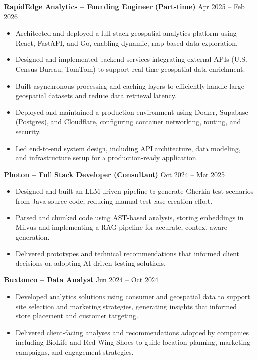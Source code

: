 \documentclass[11pt]{article}
\begin{document}
\textbf{RapidEdge Analytics – Founding Engineer (Part-time)} \hfill Apr 2025 -- Feb 2026
\begin{itemize}
    \item Architected and deployed a full-stack geospatial analytics platform using React, FastAPI, and Go, enabling dynamic, map-based data exploration.
    \item Designed and implemented backend services integrating external APIs (U.S. Census Bureau, TomTom) to support real-time geospatial data enrichment.
    \item Built asynchronous processing and caching layers to efficiently handle large geospatial datasets and reduce data retrieval latency.
    \item Deployed and maintained a production environment using Docker, Supabase (Postgres), and Cloudflare, configuring container networking, routing, and security.
    \item Led end-to-end system design, including API architecture, data modeling, and infrastructure setup for a production-ready application.
\end{itemize}

\textbf{Photon – Full Stack Developer (Consultant)} \hfill Oct 2024 -- Mar 2025
\begin{itemize}
    \item Designed and built an LLM-driven pipeline to generate Gherkin test scenarios from Java source code, reducing manual test case creation effort.
    \item Parsed and chunked code using AST-based analysis, storing embeddings in Milvus and implementing a RAG pipeline for accurate, context-aware generation.
    \item Delivered prototypes and technical recommendations that informed client decisions on adopting AI-driven testing solutions.
\end{itemize}

\textbf{Buxtonco – Data Analyst} \hfill Jun 2024 -- Oct 2024
\begin{itemize}
    \item Developed analytics solutions using consumer and geospatial data to support site selection and marketing strategies, generating insights that informed store placement and customer targeting.
    \item Delivered client-facing analyses and recommendations adopted by companies including BioLife and Red Wing Shoes to guide location planning, marketing campaigns, and engagement strategies.
\end{itemize}
\end{document}
